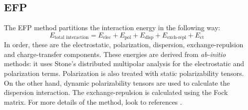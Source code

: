 \subsection{EFP}
The EFP method partitions the interaction energy in the following way:
\begin{equation*}
    E_{\text{total interaction}} = E_{\text{elec}} + E_{\text{pol}} + E_{\text{disp}} + 
                                    E_{\text{exch-repl}} + E_{\text{ct}}
\end{equation*}
In order, these are the electrostatic, polarization, dispersion, exchange-repulsion and charge-transfer components.
These energies are derived from \emph{ab-initio} methods: it uses Stone's distributed multipolar analysis 
for the electrostatic and polarization terms.
Polarization is also treated with static polarizability tensors. 
On the other hand, dynamic polarizability tensors are used to calculate the dispersion interaction.
The exchange-repulsion is calculated using the Fock matrix.
For more details of the method, look to references
.



